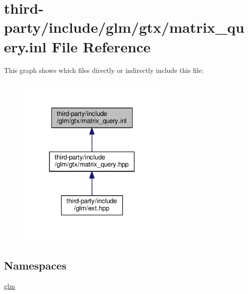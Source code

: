 \hypertarget{matrix__query_8inl}{}\section{third-\/party/include/glm/gtx/matrix\+\_\+query.inl File Reference}
\label{matrix__query_8inl}
This graph shows which files directly or indirectly include this file\+:
\nopagebreak
\begin{figure}[H]
\begin{center}
\leavevmode
\includegraphics[width=210pt]{matrix__query_8inl__dep__incl}
\end{center}
\end{figure}
\subsection*{Namespaces}
\begin{DoxyCompactItemize}
\item 
 \hyperlink{namespaceglm}{glm}
\end{DoxyCompactItemize}
